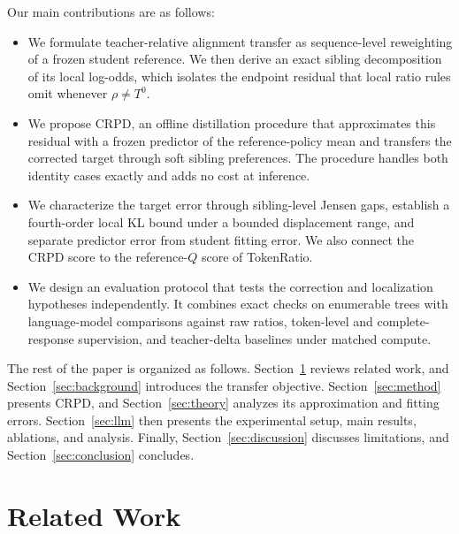 \documentclass[pdflatex,sn-mathphys-num,review]{sn-jnl}
\theoremstyle{thmstyleone}
\theoremstyle{thmstyletwo}
\theoremstyle{thmstylethree}
\providecommand{\Tz}{T^{0}}
\begin{document}
Our main contributions are as follows:
\begin{itemize}
    \item We formulate teacher-relative alignment transfer as sequence-level reweighting of a frozen student reference. We then derive an exact sibling decomposition of its local log-odds, which isolates the endpoint residual that local ratio rules omit whenever $\rho\neq\Tz$.
    \item We propose CRPD, an offline distillation procedure that approximates this residual with a frozen predictor of the reference-policy mean and transfers the corrected target through soft sibling preferences. The procedure handles both identity cases exactly and adds no cost at inference.
    \item We characterize the target error through sibling-level Jensen gaps, establish a fourth-order local KL bound under a bounded displacement range, and separate predictor error from student fitting error. We also connect the CRPD score to the reference-$Q$ score of TokenRatio.
    \item We design an evaluation protocol that tests the correction and localization hypotheses independently. It combines exact checks on enumerable trees with language-model comparisons against raw ratios, token-level and complete-response supervision, and teacher-delta baselines under matched compute.
\end{itemize}

The rest of the paper is organized as follows. Section~\ref{sec:related} reviews related work, and Section~\ref{sec:background} introduces the transfer objective. Section~\ref{sec:method} presents CRPD, and Section~\ref{sec:theory} analyzes its approximation and fitting errors. Section~\ref{sec:llm} then presents the experimental setup, main results, ablations, and analysis. Finally, Section~\ref{sec:discussion} discusses limitations, and Section~\ref{sec:conclusion} concludes.

\section{Related Work}
\label{sec:related}
\end{document}
